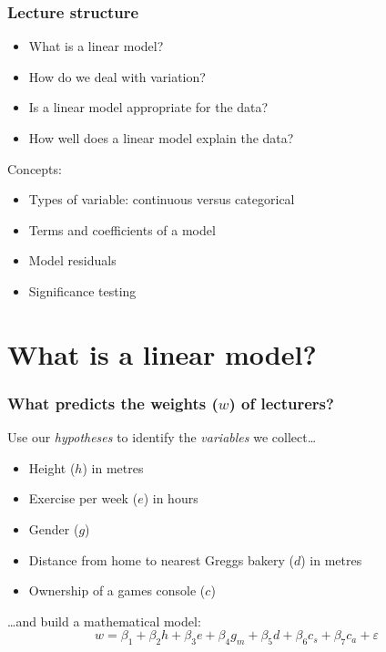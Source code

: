 \documentclass[aspectratio=43]{beamer}
\begin{document}
\frame
{
  \frametitle{Lecture structure}

  \begin{itemize}
  \item What is a linear model?
  \item How do we deal with variation?  
  \item Is a linear model appropriate for the data?
  \item How well does a linear model explain the data?
  \end{itemize}

  \vspace{12pt}
  Concepts:
  \begin{itemize}
  \item Types of variable: continuous versus categorical 
  \item Terms and coefficients of a model
  \item Model residuals
  \item Significance testing
  \end{itemize}

}

\section{What is a linear model?}


\frame
{\frametitle{What predicts the weights ($w$) of lecturers?}



Use our {\it hypotheses} to identify the {\it variables} we collect\ldots
\begin{itemize}

	\item Height ($h$) in metres
	\item Exercise per week ($e$) in hours
	\item Gender ($g$)
	\item Distance from home to nearest Greggs bakery ($d$) in metres
	\item Ownership of a games console ($c$)

\end{itemize}
\vspace{12pt}
\ldots and build a mathematical model:
\[w = \beta_1 + \beta_2 h + \beta_3 e + \beta_4 g_m  + \beta_5 d + \beta_6 c_s + \beta_7 c_a + \varepsilon\]
}
\end{document}
